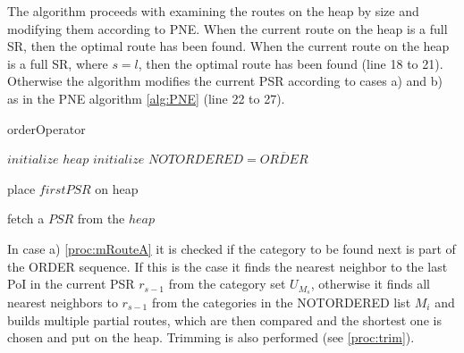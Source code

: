 The algorithm proceeds with examining the routes on the heap by size and modifying them according to PNE. When the current route on the heap is a full SR, then the optimal route has been found. When the current route on the heap is a full SR, where $s = l$, then the optimal route has been found (line 18 to 21). Otherwise the algorithm modifies the current PSR according to cases a) and b) as in the PNE algorithm \ref{alg:PNE} (line 22 to 27). \newline

\begin{algorithm}[H]
	\label{alg:order}
	\caption{orderOperator}
	
	\BlankLine
	
	$initialize$ $heap$\;
	$initialize$ $NOTORDERED = \overline{ORDER}$\;
	
	\BlankLine
	
	place $firstPSR$ on heap\;
	
	
	\BlankLine
	
	
	fetch a $PSR$ from the $heap$\;

\end{algorithm}

\pagebreak

In case a) \ref{proc:mRouteA} it is checked if the category to be found next is part of the ORDER sequence. If this is the case it finds the nearest neighbor to the last PoI in the current PSR $r_{s-1}$ from the category set $U_{M_{s}}$, otherwise it finds all nearest neighbors to $r_{s-1}$ from the categories in the NOTORDERED list $M_{i}$ and builds multiple partial routes, which are then compared and the shortest one is chosen and put on the heap.
Trimming is also performed (see \ref{proc:trim}).

